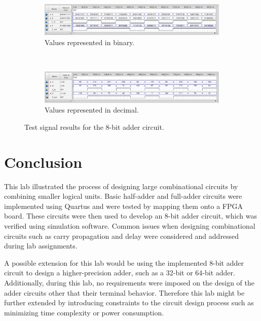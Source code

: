 \documentclass[11pt, letterpaper]{article} %
\begin{document}
\begin{landscape}
\begin{figure}[p]
    \begin{subfigure}{\linewidth}
        \includegraphics[width=\linewidth]{images/lab5-3-8bit-1-bin.png}
        \caption{Values represented in binary.}\label{fig:lab5-3-8bit-1-bin}
    \end{subfigure}
    \\[1cm]
    \begin{subfigure}{\linewidth}
       \includegraphics[width=\linewidth]{images/lab5-3-8bit-1-dec.png}
       \caption{Values represented in decimal.}\label{fig:lab5-3-8bit-1-dec}
    \end{subfigure}
    \caption{Test signal results for the 8-bit adder circuit.}\label{fig:lab5-3-8bit-1}
\end{figure}
\end{landscape}

\section*{Conclusion}

This lab illustrated the process of designing large combinational circuits by combining smaller logical units. Basic half-adder and full-adder circuits were implemented using Quartus and were tested by mapping them onto a FPGA board. These circuits were then used to develop an 8-bit adder circuit, which was verified using simulation software. Common issues when designing combinational circuits such as carry propagation and delay were considered and addressed during lab assignments. 

A possible extension for this lab would be using the implemented 8-bit adder circuit to design a higher-precision adder, such as a 32-bit or 64-bit adder. Additionally, during this lab, no requirements were imposed on the design of the adder circuits other that their terminal behavior. Therefore this lab might be further extended by introducing constraints to the circuit design process such as minimizing time complexity or power consumption.

\FloatBarrier




\end{document}
